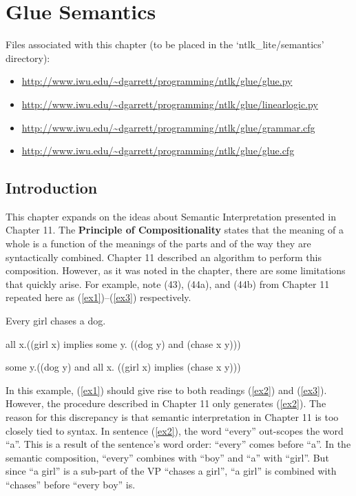 \documentclass{article}
\begin{document}
\section{Glue Semantics}

Files associated with this chapter (to be placed in the `ntlk\_lite/semantics'
directory): 

\begin{itemize}
  \item \url{http://www.iwu.edu/~dgarrett/programming/ntlk/glue/glue.py}
  \item \url{http://www.iwu.edu/~dgarrett/programming/ntlk/glue/linearlogic.py}
  \item \url{http://www.iwu.edu/~dgarrett/programming/ntlk/glue/grammar.cfg}
  \item \url{http://www.iwu.edu/~dgarrett/programming/ntlk/glue/glue.cfg}
\end{itemize}


\subsection{Introduction}
This chapter expands on the ideas about Semantic Interpretation presented in
Chapter 11.  The \textbf{Principle of Compositionality} states that the meaning
of a whole is a function of the meanings of the parts and of the way they are
syntactically combined. Chapter 11 described an algorithm to perform this
composition.  However, as it was noted in the chapter, there are some
limitations that quickly arise.  For example, note (43), (44a), and (44b) from
Chapter 11 repeated here as (\ref{ex1})--(\ref{ex3}) respectively.

\begin{examples}
	\item\label{ex1} Every girl chases a dog.
	\item\label{ex2} all x.((girl x) implies some y. ((dog y) and (chase x y)))
	\item\label{ex3} some y.((dog y) and all x. ((girl x) implies (chase x y)))
\end{examples}

In this example, (\ref{ex1}) should give rise to both readings (\ref{ex2}) and
(\ref{ex3}). However, the procedure described in Chapter 11 only generates
(\ref{ex2}). The reason for this discrepancy is that semantic interpretation in
Chapter 11 is too closely tied to syntax. In sentence (\ref{ex2}), the word
``every'' out-scopes the word ``a''. This is a result of the sentence's word
order: ``every'' comes before ``a''. In the semantic composition, ``every''
combines with ``boy'' and ``a'' with ``girl''. But since ``a girl'' is a
sub-part of the VP ``chases a girl'', ``a girl'' is combined with ``chases''
before ``every boy'' is.
\end{document}
